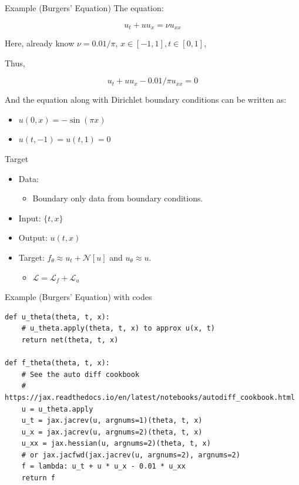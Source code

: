 \documentclass[aspectratio=1610,xcolor={dvipsnames},hyperref={colorlinks,unicode,linkcolor=violet,anchorcolor=BlueViolet,citecolor=YellowOrange,filecolor=black,urlcolor=Aquamarine}]{beamer}
\begin{document}
\begin{frame}[label={sec:org4b2172b}]{Example (Burgers' Equation)}
The equation:

\[u_t + u u_x = \nu u_{xx}\]

Here, already know \(\nu = 0.01 / \pi\), \(x \in [-1, 1], t \in [0, 1]\),

Thus,

\[u_{t} + uu_{x} - 0.01/\pi u_{xx} = 0 \]

And the equation along with Dirichlet boundary conditions can be written as:

\begin{itemize}
\item \(u(0, x) = -\sin(\pi x)\)
\item \(u(t, -1) = u(t, 1) = 0\)
\end{itemize}
\end{frame}

\begin{frame}[label={sec:orgd29dc6d}]{Target}
\begin{itemize}
\item Data:
\begin{itemize}
\item Boundary only data from boundary conditions.
\end{itemize}
\item Input: \(\{t, x\}\)
\item Output: \(u(t, x)\)
\item Target: \(f_{\theta} \approx u_{t} + \mathcal{N}[u]\) and \(u_{\theta} \approx u\).
\begin{itemize}
\item \(\mathcal{L} = \mathcal{L}_{f} + \mathcal{L}_{u}\)
\end{itemize}
\end{itemize}
\end{frame}

\begin{frame}[label={sec:orgc29be21},fragile,containsverbatim]{Example (Burgers' Equation) with codes}
 \begin{verbatim}
def u_theta(theta, t, x):
    # u_theta.apply(theta, t, x) to approx u(x, t)
    return net(theta, t, x)

def f_theta(theta, t, x):
    # See the auto diff cookbook
    # https://jax.readthedocs.io/en/latest/notebooks/autodiff_cookbook.html
    u = u_theta.apply
    u_t = jax.jacrev(u, argnums=1)(theta, t, x)
    u_x = jax.jacrev(u, argnums=2)(theta, t, x)
    u_xx = jax.hessian(u, argnums=2)(theta, t, x)
    # or jax.jacfwd(jax.jacrev(u, argnums=2), argnums=2)
    f = lambda: u_t + u * u_x - 0.01 * u_xx
    return f
\end{verbatim}
\end{frame}
\end{document}
